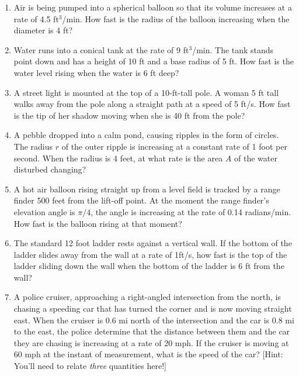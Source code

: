 \documentclass[11pt,fleqn]{article}
\begin{document}
\begin{enumerate}
\item Air is being pumped into a spherical balloon so
that its volume increases at a rate of 4.5 ft$^3$/min. How fast is the
radius of the balloon increasing when the diameter is 4 ft?
\vfill
\newpage
\item  Water runs into a conical tank at the rate of 9
ft$^3$/min. The tank stands point down and has a height of 10 ft and a
base radius of 5 ft. How fast is the water level rising when the water
is 6 ft deep?  
\vfill
\item  A street light is mounted at the top of a
10-ft-tall pole. A woman 5 ft tall walks away from the pole along a
straight path at a speed of 5 ft/s. How fast is the tip of her shadow moving when she is 40 ft from the pole?
\vfill
\newpage
\item A pebble dropped into a calm pond, causing ripples
in the form of circles. The radius $r$ of the outer ripple is
increasing at a constant rate of 1 foot per second. When the radius is
4 feet, at what rate is the area $A$ of the water disturbed changing?
\vfill
\item  A hot air balloon rising straight up from a level
field is tracked by a range finder 500 feet from the lift-off
point. At the moment the range finder's elevation angle is $\pi/4$,
the angle is increasing at the rate of 0.14 radians/min. How fast is
the balloon rising at that moment? 
\vfill
\newpage
\item  The standard 12 foot ladder rests against a vertical
wall. If the bottom of the ladder slides away from the wall at a rate
of 1ft/s, how fast is the top of the ladder sliding down the wall when
the bottom of the ladder is 6 ft from the wall? 
\vfill
\item  A police cruiser, approaching a right-angled
intersection from the north, is chasing a speeding car that has turned
the corner and is now moving straight east. When the cruiser is 0.6 mi
north of the intersection and the car is 0.8 mi to the east, the
police determine that the distance between them and the car they are
chasing is increasing at a rate of 20 mph. If the cruiser is moving at
60 mph at the instant of measurement, what is the speed of the car?
[Hint: You'll need to relate \textit{three} quantities here!]
\vfill

\end{enumerate}
\end{document}
